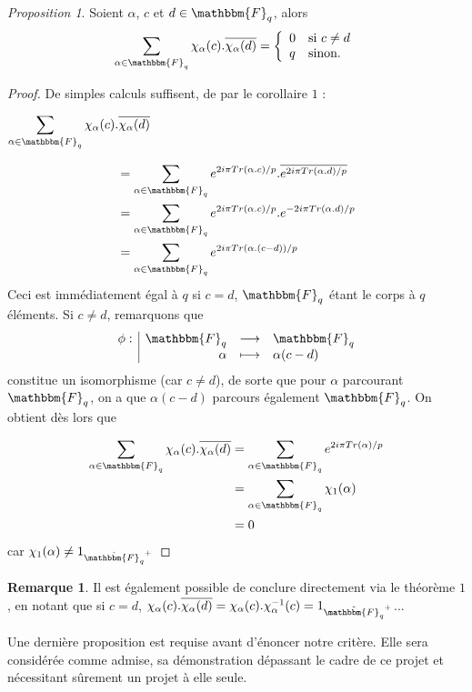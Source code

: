 \documentclass[12pt]{article}
\newcommand{\fonction}[5]{
\begin{displaymath}
\begin{array}{l|rcl}
\displaystyle
#1 : & #2 & \longrightarrow & #3 \\
    & #4 & \longmapsto & #5
\end{array}
\end{displaymath}
}
\theoremstyle{remark}\newtheorem{note}{Note}
\theoremstyle{remark}\newtheorem{nota}{Notation}
\newcommand{\Fq}{\mathbbm{F}_q}
\newtheorem{prop}{Proposition}
\theoremstyle{definition}
\newtheorem{rem}{Remarque}
\begin{document}
\begin{prop}
Soient $\alpha$, $c$ et $d \in \Fq$, alors
$$
\displaystyle\sum_{\alpha \in \Fq}\chi_\alpha(c).\overline{\chi_\alpha(d)} = \left\{
    \begin{array}{ll}
        0 & \mbox{si } c \ne d \\
        q & \mbox{sinon.}
    \end{array}
\right.
$$
\end{prop}

\begin{proof}
De simples calculs suffisent, de par le corollaire $1$ :
\begin{center}$\displaystyle\sum_{\alpha \in \Fq}\chi_\alpha(c).\overline{\chi_\alpha(d)}$\end{center}
\begin{align*} 
&= \displaystyle\sum_{\alpha \in \Fq} e^{2i\pi Tr(\alpha.c)/p}.\overline{e^{2i\pi Tr(\alpha.d)/p}} \\
&= \displaystyle\sum_{\alpha \in \Fq} e^{2i\pi Tr(\alpha.c)/p}.{e^{-2i\pi Tr(\alpha.d)/p}} \\
&= \displaystyle\sum_{\alpha \in \Fq} e^{2i\pi Tr(\alpha.(c-d))/p}
\end{align*} 
Ceci est immédiatement égal à $q$ si $c=d$, $\Fq$ étant le corps à $q$ éléments. Si $c\ne d$, remarquons que \fonction{\phi}{\Fq}{\Fq}{\alpha}{\alpha(c-d)} constitue un isomorphisme (car $c\ne d$), de sorte que pour $\alpha$ parcourant $\Fq$, on a que $\alpha(c-d)$ parcours également $\Fq$. On obtient dès lors que 

\begin{align*} 
\displaystyle\sum_{\alpha \in \Fq}\chi_\alpha(c).\overline{\chi_\alpha(d)}
&= \displaystyle\sum_{\alpha \in \Fq} e^{2i\pi Tr(\alpha)/p} \\
&= \displaystyle\sum_{\alpha \in \Fq} \chi_1(\alpha) \\
&= 0
\end{align*}
car $\chi_1(\alpha) \ne 1_{\hat{\Fq}^+}$
\end{proof}

\begin{rem}
Il est également possible de conclure directement via le théorème $1$, en notant que si $c=d$, $\chi_\alpha(c).\overline{\chi_\alpha(d)} = \chi_\alpha(c).\chi_\alpha^{-1}(c) = 1_{\hat{\Fq}^+}$...
\end{rem}

Une dernière proposition est requise avant d'énoncer notre critère. Elle sera considérée comme admise, sa démonstration dépassant le cadre de ce projet et nécessitant sûrement un projet à elle seule.
\end{document}
